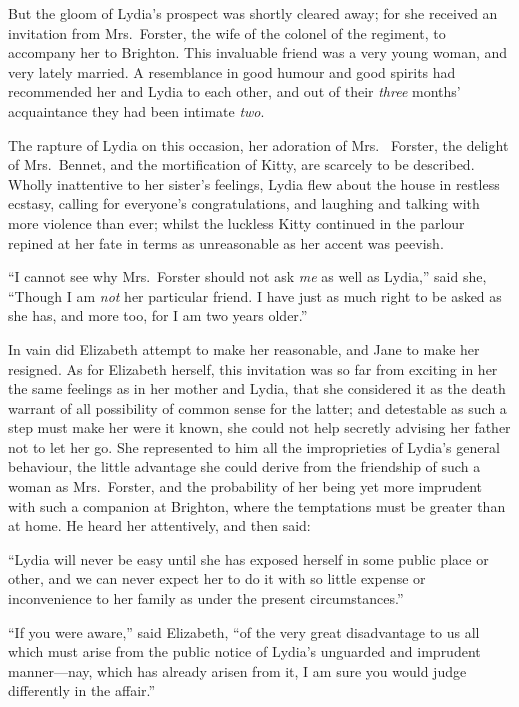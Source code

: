 But the gloom of Lydia's prospect was shortly cleared away; for
she received an invitation from Mrs.\ Forster, the wife of the
colonel of the regiment, to accompany her to Brighton.  This
invaluable friend was a very young woman, and very lately
married.  A resemblance in good humour and good spirits had
recommended her and Lydia to each other, and out of their
\emph{three} months' acquaintance they had been intimate \emph{two}.

The rapture of Lydia on this occasion, her adoration of Mrs.\ %
Forster, the delight of Mrs.\ Bennet, and the mortification of
Kitty, are scarcely to be described.  Wholly inattentive to her
sister's feelings, Lydia flew about the house in restless ecstasy,
calling for everyone's congratulations, and laughing and talking
with more violence than ever; whilst the luckless Kitty continued
in the parlour repined at her fate in terms as unreasonable as her
accent was peevish.

``I cannot see why Mrs.\ Forster should not ask \emph{me} as well as
Lydia,'' said she, ``Though I am \emph{not} her particular friend.  I
have just as much right to be asked as she has, and more too,
for I am two years older.''

In vain did Elizabeth attempt to make her reasonable, and Jane
to make her resigned.  As for Elizabeth herself, this invitation
was so far from exciting in her the same feelings as in her mother
and Lydia, that she considered it as the death warrant of all
possibility of common sense for the latter; and detestable as such
a step must make her were it known, she could not help secretly
advising her father not to let her go.  She represented to him all
the improprieties of Lydia's general behaviour, the little
advantage she could derive from the friendship of such a woman
as Mrs.\ Forster, and the probability of her being yet more
imprudent with such a companion at Brighton, where the
temptations must be greater than at home.  He heard her
attentively, and then said:

``Lydia will never be easy until she has exposed herself in some
public place or other, and we can never expect her to do it with
so little expense or inconvenience to her family as under the
present circumstances.''

``If you were aware,'' said Elizabeth, ``of the very great
disadvantage to us all which must arise from the public notice
of Lydia's unguarded and imprudent manner---nay, which has
already arisen from it, I am sure you would judge differently in
the affair.''

